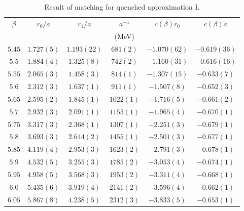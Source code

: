 \begin{table}
\begin{center}
\begin{tabular}{c|c|c|c|c|c}
    \hline    
$\beta$ & $r_0/a$ & $r_1/a$ & $a^{-1}$ & $c(\beta)r_0$ & $c(\beta)a$\\
& & & (MeV) & & \\
\hline
$5.45$ & $1.727(5)$ & $1.193(22)$ & $ 681(2)$ & $-1.070(62)$ & $-0.619(36)$\\
\hline
$5.5$  & $1.884(4)$ & $1.325(8)$  & $ 742(2)$ & $-1.160(31)$ & $-0.616(16)$\\
\hline
$5.55$ & $2.065(3)$ & $1.458(3)$  & $ 814(1)$ & $-1.307(15)$ & $-0.633(7)$\\
\hline
$5.6$  & $2.312(3)$ & $1.637(1)$  & $ 911(1)$ & $-1.507(8)$  & $-0.652(3)$\\
\hline
$5.65$ & $2.595(2)$ & $1.845(1)$  & $1022(1)$ & $-1.716(5)$  & $-0.661(2)$\\ 
\hline
$5.7$  & $2.932(3)$ & $2.091(1)$  & $1155(1)$ & $-1.965(4)$  & $-0.670(1)$\\
\hline
$5.75$ & $3.317(3)$ & $2.368(1)$  & $1307(1)$ & $-2.251(3)$  & $-0.679(1)$\\
\hline
$5.8$  & $3.693(3)$ & $2.644(2)$  & $1455(1)$ & $-2.501(3)$  & $-0.677(1)$\\
\hline
$5.85$ & $4.119(4)$ & $2.953(3)$  & $1623(2)$ & $-2.791(3)$  & $-0.678(1)$\\
\hline
$5.9$  & $4.532(5)$ & $3.255(3)$  & $1785(2)$ & $-3.053(4)$  & $-0.674(1)$\\
\hline
$5.95$ & $4.958(5)$ & $3.568(3)$  & $1953(2)$ & $-3.311(4)$  & $-0.668(1)$\\
\hline
$6.0$  & $5.435(6)$ & $3.919(4)$  & $2141(2)$ & $-3.596(4)$  & $-0.662(1)$\\
\hline
$6.05$ & $5.867(8)$ & $4.238(5)$  & $2312(3)$ & $-3.833(5)$  & $-0.653(1)$\\
\hline
\end{tabular}
\end{center}
\caption{\label{tab.res.matchingquench1}Result of matching for quenched approximation I.}
\end{table}


